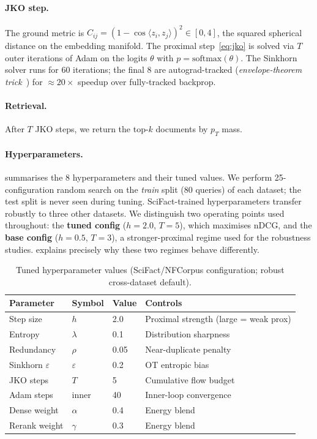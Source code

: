 \documentclass{article}
\theoremstyle{plain}
\begin{document}
\paragraph{JKO step.}
The ground metric is $C_{ij}=(1-\cos\langle z_i,z_j\rangle)^2\in[0,4]$, the squared spherical distance on the embedding manifold. The proximal step~\eqref{eq:jko} is solved via $T$ outer iterations of Adam on the logits $\theta$ with $p=\mathrm{softmax}(\theta)$. The Sinkhorn solver runs for 60 iterations; the final 8 are autograd-tracked (\emph{envelope-theorem trick}~\cite{maclaurin2015grad,luise2018differential}) for ${\approx}20\times$ speedup over fully-tracked backprop.

\paragraph{Retrieval.}
After $T$ JKO steps, we return the top-$k$ documents by $p_T$ mass.

\paragraph{Hyperparameters.}
 summarises the 8 hyperparameters and their tuned values. We perform 25-configuration random search on the \emph{train} split (80 queries) of each dataset; the test split is never seen during tuning. SciFact-trained hyperparameters transfer robustly to three other datasets. We distinguish two operating points used throughout: the \textbf{tuned config} ($h{=}2.0$, $T{=}5$), which maximises nDCG, and the \textbf{base config} ($h{=}0.5$, $T{=}3$), a stronger-proximal regime used for the robustness studies.  explains precisely why these two regimes behave differently.

\begin{table}[h]
\centering\small
\caption{Tuned hyperparameter values (SciFact/NFCorpus configuration; robust cross-dataset default).}
\label{tab:hparams}
\begin{tabular}{@{}llll@{}}
\toprule
Parameter & Symbol & Value & Controls \\
\midrule
Step size & $h$ & 2.0 & Proximal strength (large = weak prox) \\
Entropy & $\lambda$ & 0.1 & Distribution sharpness \\
Redundancy & $\rho$ & 0.05 & Near-duplicate penalty \\
Sinkhorn $\varepsilon$ & $\varepsilon$ & 0.2 & OT entropic bias \\
JKO steps & $T$ & 5 & Cumulative flow budget \\
Adam steps & inner & 40 & Inner-loop convergence \\
Dense weight & $\alpha$ & 0.4 & Energy blend \\
Rerank weight & $\gamma$ & 0.3 & Energy blend \\
\bottomrule
\end{tabular}
\end{table}
\end{document}
